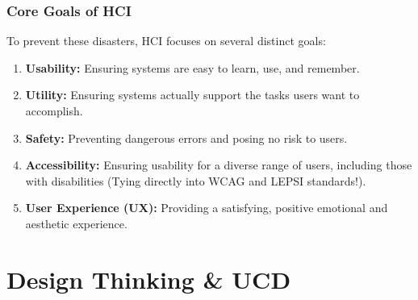 \documentclass[xcolor=table]{beamer}
\begin{document}
\begin{frame}
    \frametitle{Core Goals of HCI}
    To prevent these disasters, HCI focuses on several distinct goals:
    
    \begin{enumerate}
        \item \textbf{Usability:} Ensuring systems are easy to learn, use, and remember.
        \item \textbf{Utility:} Ensuring systems actually support the tasks users want to accomplish.
        \item \textbf{Safety:} Preventing dangerous errors and posing no risk to users.
        \item \textbf{Accessibility:} Ensuring usability for a diverse range of users, including those with disabilities (Tying directly into WCAG and LEPSI standards!).
        \item \textbf{User Experience (UX):} Providing a satisfying, positive emotional and aesthetic experience.
    \end{enumerate}
\end{frame}

\section{Design Thinking \& UCD}
\end{document}
